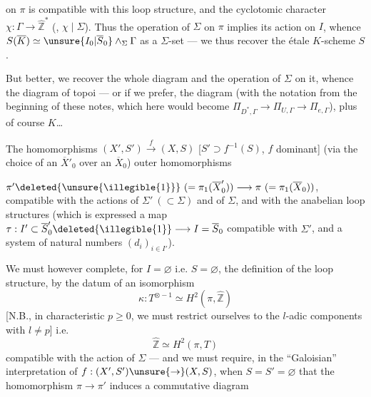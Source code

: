 
   on $\pi$ is
compatible with this loop structure,
and the cyclotomic character $\chi:\Gamma\to\widehat{\mathbb Z}^{*}$
(, $\chi\mid\Sigma$). Thus the operation of
$\Sigma$ on $\pi$ implies its action on $I$, whence
$S(\overline K)\simeq\unsure{I_0|\overline S_0}\wedge_{\Sigma}\Gamma$ as a $\Sigma$-set
--- we thus recover the étale $K$-scheme $S$.

But better, we recover the whole
diagram
and the operation of $\Sigma$ on it, whence the
diagram of topoi  --- or if
we prefer, the diagram
(with the notation from the beginning of these notes,
which here would become $\Pi_{D^{*},\Gamma}\to\Pi_{U,\Gamma}\to\Pi_{e,\Gamma}$),
plus of course $K$\dots

The homomorphisms $(X',S')\xrightarrow{f}(X,S)$
[$S'\supset f^{-1}(S)$, $f$ dominant]  
  (via the choice of an $\overline X'_0$
over an $\overline X_0$)   outer homomorphisms



$\pi'\deleted{\unsure{\illegible{1}}}\ (=\pi_1(\overline X'_0))\longrightarrow\pi\ (=\pi_1(\overline X_0))$, compatible
with the actions of $\Sigma'\ (\subset\Sigma)$ and of $\Sigma$,
and with the anabelian loop structures
(which is expressed   a map
$\tau:I'\subset\overline S'_0\deleted{\illegible{1}}\longrightarrow I=\overline S_0$ compatible with
$\Sigma'$, and a system of natural numbers
$(d_i)_{i\in I'}$).

We must however complete,  for
$I=\varnothing$ i.e. $S=\varnothing$, the definition of the
loop structure, by the datum of an
isomorphism
\[
\kappa:T^{\otimes-1}\simeq H^2(\pi,\widehat{\mathbb Z})
\]
[N.B., in characteristic $p\geq0$, we must restrict ourselves
to the $l$-adic components with $l\ne p$]
i.e.
\[
\widehat{\mathbb Z}\simeq H^2(\pi,T)
\]
compatible with the action of $\Sigma$
--- and we must require, in the
``Galoisian'' interpretation of $f:(X',S')\unsure{\to}(X,S)$, when $S=S'=\varnothing$
that the homomorphism $\pi\to\pi'$ induces a
commutative diagram

